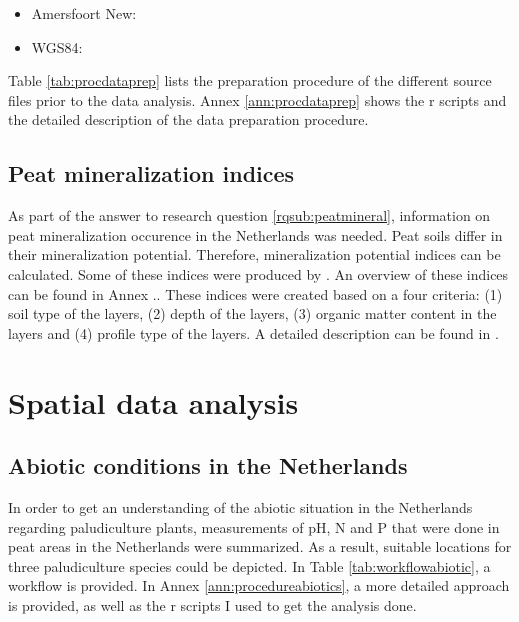 \documentclass[a4paper,12pt]{scrbook}
\begin{document}
\begin{itemize}
\item Amersfoort New: 
\item WGS84: 
\end{itemize}

Table \ref{tab:procdataprep} lists the preparation procedure of the different source files prior to the data analysis. Annex \ref{ann:procdataprep} shows the r scripts and the detailed description of the data preparation procedure.

\subsection{Peat mineralization indices}
As part of the answer to research question \ref{rqsub:peatmineral}, information on peat mineralization occurence in the Netherlands was needed. Peat soils differ in their mineralization potential. Therefore, mineralization potential indices can be calculated. Some of these indices  were produced by \citep{stouthamer2008toelichting}. An overview of these indices can be found in Annex .. These indices were created based on a four criteria: (1) soil type of the layers, (2) depth of the layers, (3) organic matter content in the layers and (4) profile type of the layers. A detailed description can be found in \citep{stouthamer2008toelichting}. 

\section{Spatial data analysis}

\subsection{Abiotic conditions in the Netherlands}
In order to get an understanding of the abiotic situation in the Netherlands regarding paludiculture plants, measurements of pH, \ac{N} and \ac{P} that were done in peat areas in the Netherlands were summarized. As a result, suitable locations for three paludiculture species could be depicted. In Table \ref{tab:workflowabiotic}, a workflow is provided. In Annex \ref{ann:procedureabiotics}, a more detailed approach is provided, as well as the r scripts I used to get the analysis done.
\end{document}
